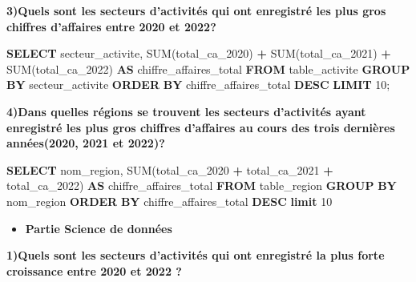 \documentclass[mstat,12pt]{unswthesis}
\newenvironment{Shaded}{\begin{snugshade}}{\end{snugshade}}
\newcommand{\DecValTok}[1]{\textcolor[rgb]{0.00,0.00,0.81}{#1}}
\newcommand{\FunctionTok}[1]{\textcolor[rgb]{0.00,0.00,0.00}{#1}}
\newcommand{\KeywordTok}[1]{\textcolor[rgb]{0.13,0.29,0.53}{\textbf{#1}}}
\newcommand{\NormalTok}[1]{#1}
\newcommand{\OperatorTok}[1]{\textcolor[rgb]{0.81,0.36,0.00}{\textbf{#1}}}
\begin{document}
\medskip

\textbf{3)Quels sont les secteurs d'activités qui ont enregistré les
plus gros chiffres d'affaires entre 2020 et 2022?}

\begin{Shaded}
\begin{Highlighting}[]
\KeywordTok{SELECT}\NormalTok{ secteur\_activite, }\FunctionTok{SUM}\NormalTok{(total\_ca\_2020) }\OperatorTok{+} \FunctionTok{SUM}\NormalTok{(total\_ca\_2021) }\OperatorTok{+} \FunctionTok{SUM}\NormalTok{(total\_ca\_2022) }\KeywordTok{AS}\NormalTok{ chiffre\_affaires\_total}
\KeywordTok{FROM}\NormalTok{ table\_activite}
\KeywordTok{GROUP} \KeywordTok{BY}\NormalTok{ secteur\_activite}
\KeywordTok{ORDER} \KeywordTok{BY}\NormalTok{ chiffre\_affaires\_total }\KeywordTok{DESC}
\KeywordTok{LIMIT} \DecValTok{10}\NormalTok{;}
\end{Highlighting}
\end{Shaded}

\bigskip

\textbf{4)Dans quelles régions se trouvent les secteurs d'activités
ayant enregistré les plus gros chiffres d'affaires au cours des trois
dernières années(2020, 2021 et 2022)? }

\begin{Shaded}
\begin{Highlighting}[]
\KeywordTok{SELECT}\NormalTok{ nom\_region, }\FunctionTok{SUM}\NormalTok{(total\_ca\_2020 }\OperatorTok{+}\NormalTok{ total\_ca\_2021 }
\OperatorTok{+}\NormalTok{ total\_ca\_2022) }\KeywordTok{AS}\NormalTok{ chiffre\_affaires\_total}
\KeywordTok{FROM}\NormalTok{ table\_region}
\KeywordTok{GROUP} \KeywordTok{BY}\NormalTok{ nom\_region}
\KeywordTok{ORDER} \KeywordTok{BY}\NormalTok{ chiffre\_affaires\_total }\KeywordTok{DESC} \KeywordTok{limit} \DecValTok{10}
\end{Highlighting}
\end{Shaded}

\bigskip

\begin{itemize}
\tightlist
\item
  \textbf{Partie Science de données}\bigskip
\end{itemize}

\textbf{1)Quels sont les secteurs d'activités qui ont enregistré la plus
forte croissance entre 2020 et 2022 ?}
\end{document}
